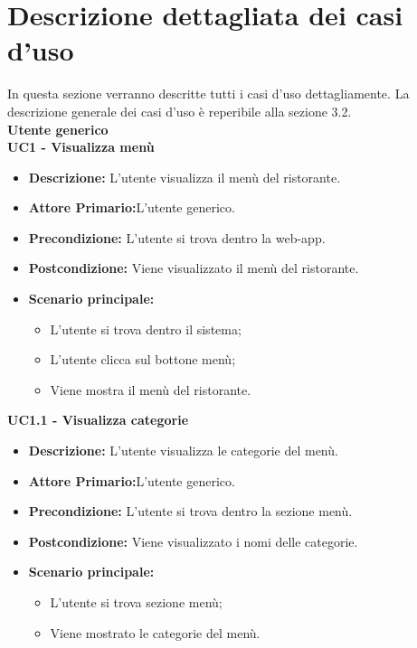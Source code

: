 
\chapter{Descrizione dettagliata dei casi d'uso}
\label{cap:appendice a}
In questa sezione verranno descritte tutti i casi d'uso dettagliamente.
La descrizione generale dei casi d'uso è reperibile alla sezione 3.2.\\

\textbf{Utente generico}\\
\textbf{UC1 - Visualizza menù}
\begin{itemize}
    \item \textbf{Descrizione:} L'utente visualizza il menù del ristorante.
    \item \textbf{Attore Primario:}L'utente generico.
    \item \textbf{Precondizione:} L'utente si trova dentro la web-app.
    \item \textbf{Postcondizione:} Viene visualizzato il menù del ristorante.
    \item \textbf{Scenario principale:}
    \begin{itemize}
        \item L'utente si trova dentro il sistema;
        \item L'utente clicca sul bottone menù;
        \item Viene mostra il menù del ristorante.
    \end{itemize}
\end{itemize}
\textbf{UC1.1 - Visualizza categorie}
\begin{itemize}
    \item \textbf{Descrizione:} L'utente visualizza le categorie del menù.
    \item \textbf{Attore Primario:}L'utente generico.
    \item \textbf{Precondizione:} L'utente si trova dentro la sezione menù.
    \item \textbf{Postcondizione:} Viene visualizzato i nomi delle categorie.
    \item \textbf{Scenario principale:}
    \begin{itemize}
        \item L'utente si trova sezione menù;
        \item Viene mostrato le categorie del menù.
    \end{itemize}
\end{itemize}
